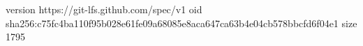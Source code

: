 version https://git-lfs.github.com/spec/v1
oid sha256:c75fc4ba110f95b028e61fe09a68085e8aca647ca63b4e04cb578bbcfd6f04e1
size 1795
